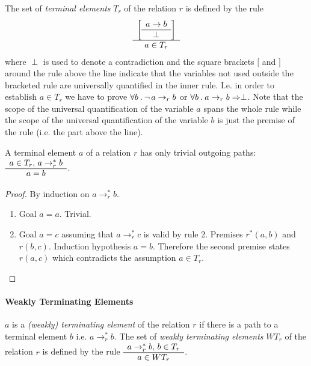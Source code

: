 \begin{definition}
  The set of \emph{terminal elements} $T_r$ of the relation $r$ is
  defined by the rule
  $$
  \begin{array}{c} 
    \begin{bmatrix}
      \begin{array}{c} a\to b \\ \hline \perp\end{array}
    \end{bmatrix} \\ \hline a \in T_r\end{array}$$
%
  where $\perp$ is used to denote a contradiction and the square brackets $[$
  and $]$ around the rule above the line indicate that the variables not used
  outside the bracketed rule are universally quantified in the inner
  rule. I.e. in order to establish $a \in T_r$ we have to prove
  $\forall b \mathbin. \neg\, a \to_r b$ or
  $\forall b\mathbin. a \to_r b \Rightarrow \perp$.
%
  Note that the scope of the universal quantification of the variable $a$
  spans the whole rule while the scope of the universal quantification of the
  variable $b$ is just the premise of the rule (i.e. the part above the line).
\end{definition}



\begin{theorem}
  \label{trivialpaths}
  A terminal element $a$ of a relation $r$ has only trivial outgoing paths:
  $\begin{array}{c} a \in T_r, \, a \to_r^* b \\ \hline a = b\end{array}$.
  \begin{proof} By induction on $a \to_r^* b$.
    \begin{enumerate}
    \item
      Goal $a = a$. Trivial.
    \item
      Goal $a = c$ assuming that $a \to_r^* c$ is valid by rule 2. Premises
      $r^*(a,b)$ and $r(b,c)$. Induction hypothesis $a = b$. Therefore the
      second premise states $r(a,c)$ which contradicts the assumption $a \in T_r$.
    \end{enumerate}
  \end{proof}
\end{theorem}




\paragraph{Weakly Terminating Elements}

\begin{definition}
  $a$ is a \emph{(weakly) terminating element} of the relation $r$ if there
  is a path to a terminal element $b$ i.e. $a \to_r^* b$. The set of
  \emph{weakly terminating elements} $WT_r$ of the relation $r$ is defined by
  the rule $\begin{array}{c} a \to_r^* b, \, b \in T_r \\ \hline a \in WT_r\end{array}$.
\end{definition}






